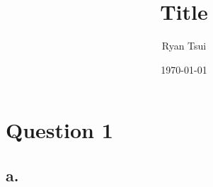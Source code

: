 \documentclass[12pt,letterpaper]{article}
\title{\textbf{Title}}
\author{Ryan Tsui}
\date{\today}
\begin{document}
\maketitle

\section{Question 1}
\subsection*{a.}

\begin{equation*}
\end{equation*}
\end{document}
